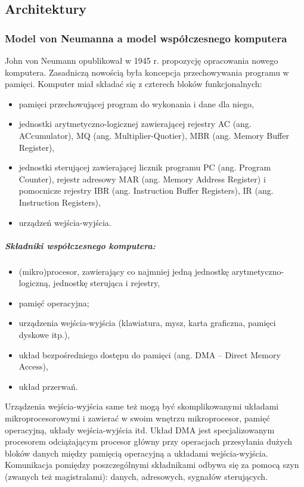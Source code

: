 \documentclass[a4paper,twoside]{report}
\begin{document}
\subsection{Architektury} 
 
\subsubsection{Model von Neumanna a model współczesnego komputera} 
John von Neumann opublikował w 1945 r. propozycję opracowania nowego komputera. Zasadniczą nowością była
koncepcja przechowywania programu w pamięci. Komputer miał składać się z czterech bloków funkcjonalnych:
\begin{itemize}
\item pamięci przechowującej program do wykonania i dane dla niego,
\item jednostki arytmetyczno-logicznej zawierającej rejestry AC (ang. ACcumulator), MQ (ang. Multiplier-Quotier), MBR
(ang. Memory Buffer Register),
\item jednostki sterującej zawierającej licznik programu PC (ang. Program Counter), rejestr adresowy MAR (ang. Memory
Address Register) i pomocnicze rejestry IBR (ang. Instruction Buffer Registers), IR (ang. Instruction Registers),
\item urządzeń wejścia-wyjścia.
\end{itemize}

\subparagraph{Składniki współczesnego komputera:}
\begin{itemize}
\item (mikro)procesor, zawierający co najmniej jedną jednostkę arytmetyczno-logiczną, jednostkę sterująca i rejestry,
\item pamięć operacyjna;
\item urządzenia wejścia-wyjścia (klawiatura, mysz, karta graficzna, pamięci dyskowe itp.),
\item układ bezpośredniego dostępu do pamięci (ang. DMA – Direct Memory Access),
\item układ przerwań.
\end{itemize}
Urządzenia wejścia-wyjścia same też mogą być skomplikowanymi układami mikroprocesorowymi i zawierać w swoim
wnętrzu mikroprocesor, pamięć operacyjną, układy wejścia-wyjścia itd. Układ DMA jest specjalizowanym procesorem odciążającym procesor główny przy operacjach przesyłania dużych bloków danych między pamięcią operacyjną a układami wejścia-wyjścia. Komunikacja pomiędzy poszczególnymi składnikami odbywa się za pomocą szyn (zwanych też magistralami): danych, adresowych, sygnałów sterujących.
\end{document}
